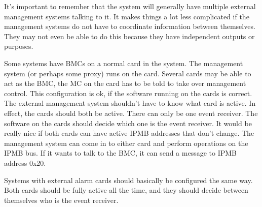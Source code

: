 It's important to remember that the system will generally have
multiple external management systems talking to it.  It makes things a
lot less complicated if the management systems do not have to
coordinate information between themselves.  They may not even be able
to do this because they have independent outputs or purposes.

Some systems have BMCs on a normal card in the system.  The management
system (or perhaps some proxy) runs on the card.  Several cards may be
able to act as the BMC, the MC on the card has to be told to take over
management control.  This configuration is ok, if the software running
on the cards is correct.  The external management system shouldn't
have to know what card is active.  In effect, the cards should both be
active.  There can only be one event receiver.  The software on the
cards should decide which one is the event receiver.  It would be
really nice if both cards can have active IPMB addresses that don't
change.  The management system can come in to either card and perform
operations on the IPMB bus.  If it wants to talk to the BMC, it can
send a message to IPMB address 0x20.

Systems with external alarm cards should basically be configured the
same way.  Both cards should be fully active all the time, and they
should decide between themselves who is the event receiver.
